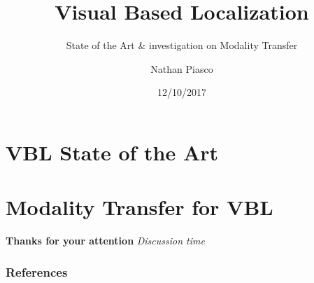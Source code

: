 \documentclass[9pt]{beamer}
\title[Visual Based Localization]{Visual Based Localization}
\subtitle{State of the Art \& investigation on Modality Transfer}
\author{Nathan Piasco}
\institute{pLaTINUM project, Le Creusot} %
\date{12/10/2017}
\begin{document}
\begin{frame}[plain,c]
	\titlepage
\end{frame}

\begin{frame}[plain,c]
	\tableofcontents
\end{frame}

\section{VBL State of the Art}

\section{Modality Transfer for VBL}




\begin{frame}[plain,c]
\centering
\vfill
\textbf{\huge{Thanks for your attention}}
\vfill
\huge{\textit{Discussion time}}
\vfill
\end{frame}



\begin{frame}
\frametitle{References}


\scriptsize{}

\end{frame}

\appendix


 
\end{document}
